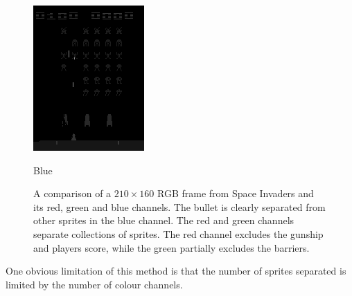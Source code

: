 \begin{figure}[h!]
\begin{multicols}{4}
    \includegraphics[scale=0.7]{figures/methods/separating_colour_spaces_b.png}
    \caption{Blue}
\end{multicols}
\caption{A comparison of a $210 \times 160$ RGB frame from Space Invaders and its red, green and blue channels. The bullet is clearly separated from other sprites in the blue channel. The red and green channels separate collections of sprites. The red channel excludes the gunship and players score, while the green partially excludes the barriers.}
\label{fig:separating_colour_spaces}
\end{figure}

One obvious limitation of this method is that the number of sprites separated is limited by the number of colour channels.
